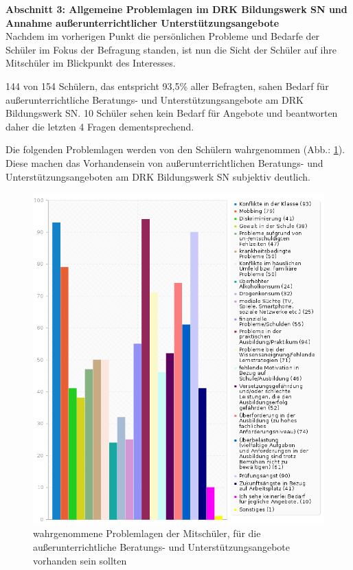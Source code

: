 \noindent
\textbf{Abschnitt 3: Allgemeine Problemlagen im DRK Bildungswerk SN und Annahme außerunterrichtlicher Unterstützungsangebote}\\

\noindent
Nachdem im vorherigen Punkt die persönlichen Probleme und Bedarfe der Schüler im Fokus der Befragung standen, ist nun die Sicht der Schüler auf ihre Mitschüler im Blickpunkt des Interesses.

144 von 154 Schülern, das entspricht 93,5\% aller Befragten, sahen Bedarf für außerunterrichtliche Beratungs- und Unterstützungsangebote am DRK Bildungswerk SN. 10 Schüler sehen kein Bedarf für Angebote und beantworten daher die letzten 4 Fragen dementsprechend.

Die folgenden Problemlagen werden von den Schülern wahrgenommen (Abb.: \ref{fig:Problemlagen-der-Mitschueler}). Diese machen das Vorhandensein von außerunterrichtlichen Beratungs- und Unterstützungsangeboten am DRK Bildungswerk SN subjektiv deutlich.

\begin{figure}[h]
	\centering
		\includegraphics[width=1.0\textwidth]{images/Problemlagen-der-Mitschueler.png}
	\caption{wahrgenommene Problemlagen der Mitschüler, für die außerunterrichtliche Beratungs- und Unterstützungsangebote vorhanden sein sollten}
	\label{fig:Problemlagen-der-Mitschueler}
\end{figure}

